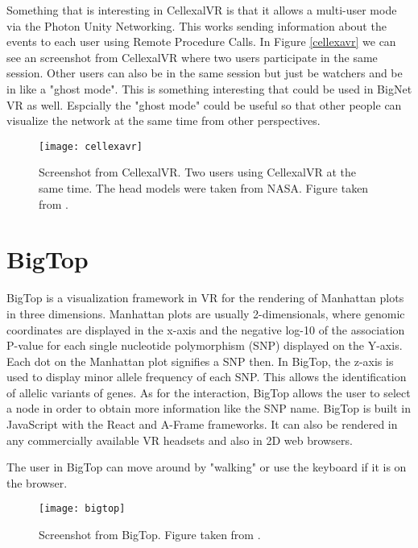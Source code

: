 Something that is interesting in CellexalVR is that it allows a multi-user mode via the Photon Unity Networking. This works sending information about the events to each user using Remote Procedure Calls. In Figure \ref{cellexavr} we can see an screenshot from CellexalVR where two users participate in the same session. Other users can also be in the same session but just be watchers and be in like a "ghost mode". This is something interesting that could be used in BigNet VR as well. Espcially the "ghost mode" could be useful so that other people can visualize the network at the same time from other perspectives.

\begin{figure}[h!]
    \centering%
    \texttt{[image: cellexavr]}
    \caption{Screenshot from CellexalVR. Two users using CellexalVR at the same time. The head models were taken from NASA. Figure taken from \cite{cellexalvr}.}
    \label{fig:cellexavr}
\end{figure}%

\section{BigTop}
BigTop is a visualization framework in VR for the rendering of Manhattan plots in three dimensions\cite{bigtop}. Manhattan plots are usually 2-dimensionals, where genomic coordinates are displayed in the x-axis and the negative log-10 of the association P-value for each single nucleotide polymorphism (SNP) displayed on the Y-axis. Each dot on the Manhattan plot signifies a SNP then. In BigTop, the z-axis is used to display minor allele frequency of each SNP. This allows the identification of allelic variants of genes. As for the interaction, BigTop allows the user to select a node in order to obtain more information like the SNP name. BigTop is built in JavaScript with the React and A-Frame frameworks. It can also be rendered in any commercially available VR headsets and also in 2D web browsers.

The user in BigTop can move around by "walking" or use the keyboard if it is on the browser. 

\begin{figure}[h!]
    \centering%
    \texttt{[image: bigtop]}
    \caption{Screenshot from BigTop. Figure taken from \cite{bigtop}.}
    \label{fig:bigtop}
\end{figure}%
